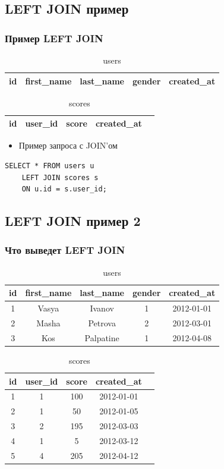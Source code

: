 \documentclass[compress,red]{beamer}
\begin{document}
\subsection{LEFT JOIN пример}
\begin{frame}[fragile]
  \frametitle{Пример LEFT JOIN}
  \begin{table}
    \begin{tabular}{|c|c|c|c|c|}
      \hline
      id & first\_name & last\_name & gender & created\_at\\
      \hline
    \end{tabular}
    \caption{users}
  \end{table}
  \begin{table}
    \begin{tabular}{|c|c|c|c|c|}
      \hline
      id & user\_id & score & created\_at\\
      \hline
    \end{tabular}
    \caption{scores}
  \end{table}
  \begin{itemize}
    \item Пример запроса с JOIN'ом
  \end{itemize}
  \scriptsize{
  \begin{lstlisting}[label=sql3,caption=LEFT JOIN]
    SELECT * FROM users u 
    LEFT JOIN scores s
    ON u.id = s.user_id;
  \end{lstlisting}
  }
\end{frame}

\subsection{LEFT JOIN пример 2}
\begin{frame}[fragile]
  \frametitle{Что выведет LEFT JOIN}
  \begin{table}
    \begin{tabular}{|c|c|c|c|c|}
      \hline
      id & first\_name & last\_name & gender & created\_at\\
      \hline
      1 & Vasya & Ivanov & 1 & 2012-01-01 \\
      2 & Masha & Petrova & 2 & 2012-03-01 \\
      3 & Kos & Palpatine & 1 & 2012-04-08 \\
      \hline
    \end{tabular}
    \caption{users}
  \end{table}
  \begin{table}
    \begin{tabular}{|c|c|c|c|c|}
      \hline
      id & user\_id & score & created\_at\\
      \hline
      1 & 1 & 100 & 2012-01-01\\
      2 & 1 & 50 & 2012-01-05\\
      3 & 2 & 195 & 2012-03-03\\
      4 & 1 & 5 & 2012-03-12\\
      5 & 4 & 205 & 2012-04-12\\
      \hline
    \end{tabular}
    \caption{scores}
  \end{table}
\end{frame}
\end{document}
